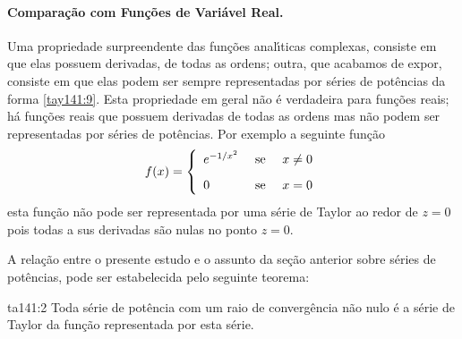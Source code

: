 \paragraph{Compara\c{c}\~{a}o com Fun\c{c}\~{o}es de Vari\'{a}vel Real.} Uma
propriedade surpreendente das fun\c{c}\~{o}es anal\'{\i}ticas complexas,
consiste em que elas possuem derivadas, de todas as ordens; outra,
que acabamos de expor, consiste em que elas podem ser sempre
representadas por s\'{e}ries de pot\^{e}ncias da forma \eqref{tay141:9}.
Esta propriedade em geral n\~{a}o \'{e} verdadeira para fun\c{c}\~{o}es reais; h\'{a}
fun\c{c}\~{o}es reais que possuem derivadas de todas as ordens mas n\~{a}o
podem ser representadas por s\'{e}ries de pot\^{e}ncias. Por exemplo a
seguinte fun\c{c}\~{a}o
\begin{equation*}
    f(x)=\left\{%
\begin{array}{ll}
    e^{-1/x^2} & \hbox{ se }\quad x\neq 0 \\[2ex]
    0 & \hbox{ se }\quad x=0 
\end{array}%
\right.
\end{equation*}
esta fun\c{c}\~{a}o n\~{a}o pode ser representada por uma s\'{e}rie de Taylor ao
redor de $z=0$ pois todas a sus derivadas s\~{a}o nulas no ponto
$z=0$.

A rela\c{c}\~{a}o entre o presente estudo e o assunto da se\c{c}\~{a}o anterior
sobre s\'{e}ries de pot\^{e}ncias, pode ser estabelecida pelo seguinte
teorema:

\begin{theoc}{}{ta141:2} 
Toda s\'{e}rie de pot\^{e}ncia com um raio de converg\^{e}ncia n\~{a}o
nulo \'{e} a s\'{e}rie de Taylor da fun\c{c}\~{a}o representada por esta s\'{e}rie.
\end{theoc}

